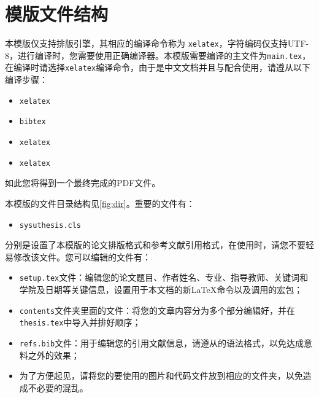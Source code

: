 \section{模版文件结构}

本模版仅支持排版引擎，其相应的编译命令称为 \texttt{xelatex}，字符编码仅支持UTF-8，进行编译时，您需要使用正确编译器。本模版需要编译的主文件为\texttt{main.tex}，在编译时请选择\texttt{xelatex}编译命令，由于是中文文档并且与配合使用，请遵从以下编译步骤：
\begin{itemize}
    \item \texttt{xelatex}
    \item \texttt{bibtex}
    \item \texttt{xelatex}
    \item \texttt{xelatex}
\end{itemize}
如此您将得到一个最终完成的PDF文件。

本模版的文件目录结构见\ref{fig:dir}。重要的文件有：
\begin{itemize}
    \item \texttt{sysuthesis.cls}
\end{itemize}
分别是设置了本模版的论文排版格式和参考文献引用格式，在使用时，请您不要轻易修改该文件。您可以编辑的文件有：
\begin{itemize}
    \item \texttt{setup.tex}文件：编辑您的论文题目、作者姓名、专业、指导教师、关键词和学院及日期等关键信息，设置用于本文档的新\LaTeX{}命令以及调用的宏包；
    \item \texttt{contents}文件夹里面的文件：将您的文章内容分为多个部分编辑好，并在\texttt{thesis.tex}中导入并排好顺序；
    \item \texttt{refs.bib}文件：用于编辑您的引用文献信息，请遵从的语法格式，以免达成意料之外的效果；
    \item 为了方便起见，请将您的要使用的图片和代码文件放到相应的文件夹，以免造成不必要的混乱。
\end{itemize}

